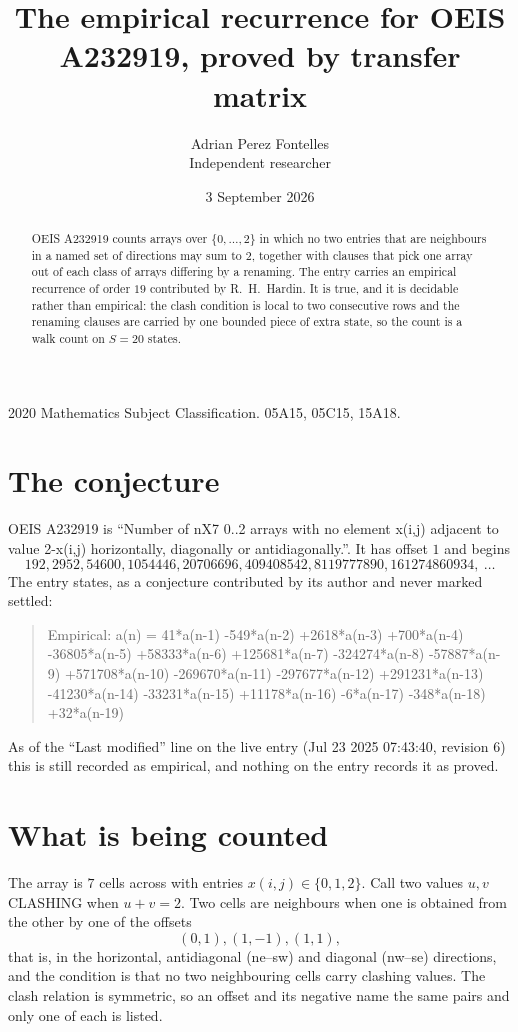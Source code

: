 \documentclass[11pt,a4paper]{article}
\title{The empirical recurrence for OEIS A232919, proved by transfer matrix}
\author{Adrian Perez Fontelles\\ \small Independent researcher}
\date{3 September 2026}
\theoremstyle{plain}
\theoremstyle{definition}
\begin{document}
\maketitle

\begin{abstract}
OEIS A232919 counts arrays over $\{0,\dots,2\}$ in which no two entries that are neighbours in
a named set of directions may sum to $2$, together with clauses that pick one array out of
each class of arrays differing by a renaming. The entry carries an empirical recurrence of
order $19$ contributed by R.~H.~Hardin. It is true, and it is decidable rather than
empirical: the clash condition is local to two consecutive rows and the renaming clauses are
carried by one bounded piece of extra state, so the count is a walk count on $S=20$ states.
\end{abstract}

\noindent\small 2020 Mathematics Subject Classification. 05A15, 05C15, 15A18.\normalsize

\section{The conjecture}

OEIS A232919 is ``Number of nX7 0..2 arrays with no element x(i,j) adjacent to value 2-x(i,j) horizontally, diagonally or antidiagonally.''. It has offset $1$ and begins
\[
192, 2952, 54600, 1054446, 20706696, 409408542, 8119777890, 161274860934,\ \dots
\]
The entry states, as a conjecture contributed by its author and never marked settled:
\begin{quote}
Empirical: a(n) = 41*a(n-1) -549*a(n-2) +2618*a(n-3) +700*a(n-4) -36805*a(n-5) +58333*a(n-6) +125681*a(n-7) -324274*a(n-8) -57887*a(n-9) +571708*a(n-10) -269670*a(n-11) -297677*a(n-12) +291231*a(n-13) -41230*a(n-14) -33231*a(n-15) +11178*a(n-16) -6*a(n-17) -348*a(n-18) +32*a(n-19)
\end{quote}
As of the ``Last modified'' line on the live entry (Jul 23 2025 07:43:40, revision 6) this is still
recorded as empirical, and nothing on the entry records it as proved.

\section{What is being counted}

The array is $7$ cells across with entries $x(i,j)\in\{0,1,2\}$. Call two values $u,v$ CLASHING
when $u+v=2$. Two cells are neighbours when one is obtained from the other by one of
the offsets
\[
(0,1), (1,-1), (1,1),
\]
that is, in the horizontal, antidiagonal (ne--sw) and diagonal (nw--se) directions, and the condition is that no two neighbouring cells carry
clashing values. The clash relation is symmetric, so an offset and its negative name the
same pairs and only one of each is listed.
\end{document}
